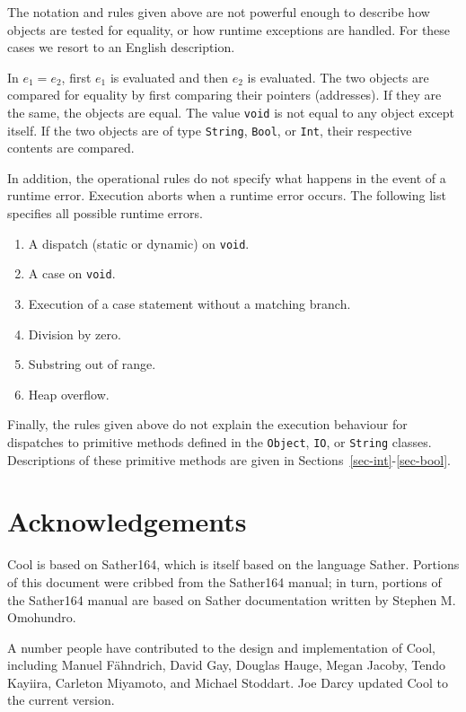 \documentclass[11pt]{article}
\def\C#1{{\tt{}#1}}
\begin{document}
The notation and rules given above are not powerful enough to
describe how objects are tested for equality, or how runtime
exceptions are handled.  For these cases we resort to an
English description.

In $e_1 = e_2$, first $e_1$ is evaluated and then $e_2$ is evaluated.
The two objects are compared for equality by first comparing their
pointers (addresses). If they are the same, the objects are equal. 
The value {\tt void} is not equal to any object except itself.  
If the two objects are of type \C{String}, \C{Bool}, or \C{Int}, their respective
contents are compared.

In addition, the operational rules do not specify what happens in the
event of a runtime error.  Execution aborts when a runtime error
occurs. The following list specifies all possible runtime errors.
\begin{enumerate}
\item A dispatch (static or dynamic) on {\tt void}.
\item A case on {\tt void}.
\item Execution of a case statement without a matching branch.
\item Division by zero.
\item Substring out of range.
\item Heap overflow.

\end{enumerate}


Finally, the rules given above do not
explain the execution behaviour for dispatches to primitive methods defined in
the \C{Object}, \C{IO}, or \C{String} classes.
Descriptions of these primitive methods are given in Sections~\ref{sec-int}-\ref{sec-bool}.

\section{Acknowledgements}

Cool is based on Sather164, which is itself based on the language
Sather.  Portions of this document were cribbed from the Sather164
manual; in turn, portions of the Sather164 manual are based on Sather
documentation written by Stephen M. Omohundro.

A number people have contributed to the design and implementation of
Cool, including Manuel F\"{a}hndrich, David Gay, Douglas Hauge, Megan
Jacoby, Tendo Kayiira, Carleton Miyamoto, and Michael Stoddart.  Joe
Darcy updated Cool to the current version.
\end{document}
